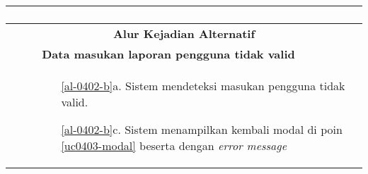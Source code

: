 \begin{table}[H]
\begin{tabular}{|r|p{8cm}|}
\begin{enumerate}
			\end{enumerate}
			\\ \hline
			\multicolumn{2}{|c|}{\textbf{Alur Kejadian Alternatif}} \\ \hline
			\multicolumn{1}{|l|}{}      
			& \textbf{Data masukan laporan pengguna tidak valid}
			\\ \hline
			\multicolumn{1}{|l|}{}& 
			\begin{itemize}
				\item[\ref{al-0402-b}a.] Sistem mendeteksi masukan pengguna tidak valid.
				\item[\ref{al-0402-b}c.] Sistem menampilkan kembali modal di poin \ref{uc0403-modal} beserta dengan \textit{error message}
			\end{itemize}
			\\ \hline
		\end{tabular}
	\end{table}